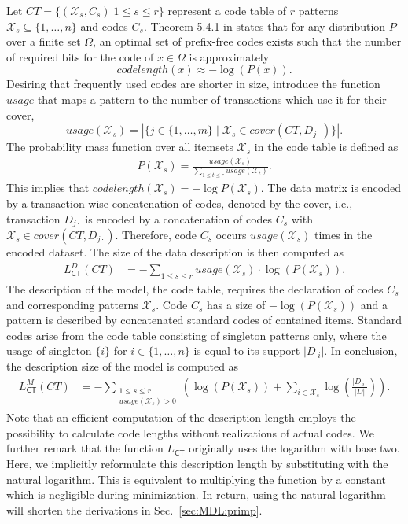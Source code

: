 Let $CT=\{(\mathcal{X}_s,C_s)|1\leq s\leq r\}$ represent a code table of $r$ patterns $\mathcal{X}_s\subseteq\{1,\ldots,n\}$ and codes $C_s$. Theorem 5.4.1 in \cite{cover2012elements} states that for any distribution $P$ over a finite set $\Omega$, an optimal set of prefix-free codes exists such that the number of required bits for the code of $x\in\Omega$ is approximately
\begin{equation*}
	codelength(x) \approx -\log(P(x)).
\end{equation*}
Desiring that frequently used codes are shorter in size, \cite{siebes2006item} introduce the function $usage$ that maps a pattern to the number of transactions which use it for their cover,
\[usage(\mathcal{X}_s)=|\{j\in\{1,\ldots,m\}\mid \mathcal{X}_s\in cover(CT,D_{j\cdot})\}|.\] 
The probability mass function over all itemsets $\mathcal{X}_s$ in the code table  is defined as
\begin{align}\label{eq:krimpCodeProb}
P(\mathcal{X}_s) = \frac{usage(\mathcal{X}_s)}{\sum_{1\leq t \leq r}usage(\mathcal{X}_t)}.
\end{align}
This implies that $codelength(\mathcal{X}_s)=-\log P(\mathcal{X}_s)$. The data matrix is encoded by a transaction-wise concatenation of codes, denoted by the cover, i.e., transaction $D_{j\cdot}$ is encoded by a concatenation of codes $C_s$ with $\mathcal{X}_s\in cover(CT,D_{j\cdot})$. Therefore, code $C_s$ occurs $usage(\mathcal{X}_s)$ times in the encoded dataset. The size of the data description is then computed as
\begin{align*}
	L^D_{\mathsf{CT}}(CT)
    &=-\sum_{1\leq s\leq r} usage(\mathcal{X}_s) \cdot \log(P(\mathcal{X}_s)).
\end{align*}
The description of the model, the code table, requires the declaration of codes $C_s$ and corresponding patterns $\mathcal{X}_s$. Code $C_s$ has a size of $-\log\left(P(\mathcal{X}_s)\right)$ and a pattern is described by concatenated standard codes of contained items. Standard codes arise from the code table consisting of singleton patterns only, where the usage of singleton $\{i\}$ for $i\in\{1,\ldots,n\}$ is equal to its support $|D_{\cdot i}|$. In conclusion, the description size of the model is computed as  
\begin{align*}
	L_{\mathsf{CT}}^M(CT)
    &= -\sum_{\substack{1\leq s\leq r \\ usage(\mathcal{X}_s)>0}}\left(\log\left(P(\mathcal{X}_s)\right) +\sum_{i\in \mathcal{X}_s}\log\left(\frac{|D_{\cdot i}|}{|D|}\right)\right).
\end{align*}
Note that an efficient computation of the description length employs the possibility to calculate code lengths without realizations of actual codes.
We further remark that the function $L_{\mathsf{CT}}$ originally uses the logarithm with base two. Here, we implicitly reformulate this description length by substituting with the natural logarithm. This is equivalent to multiplying the function by a constant which is negligible during minimization. In return, using the natural logarithm will shorten the derivations in Sec.~\ref{sec:MDL:primp}.

